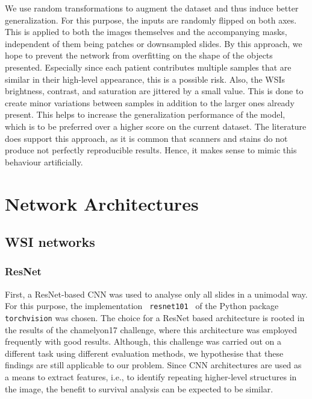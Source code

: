 We use random transformations to augment the dataset and thus induce better generalization. For this purpose, the inputs are randomly flipped on both axes. This is applied to both the images themselves and the accompanying masks, independent of them being patches or downsampled slides. By this approach, we hope to prevent the network from overfitting on the shape of the objects presented. Especially since each patient contributes multiple samples that are similar in their high-level appearance, this is a possible risk.
Also, the WSIs brightness, contrast, and saturation are jittered by a small value. This is done to create minor variations between samples in addition to the larger ones already present. This helps to increase the generalization performance of the model, which is to be preferred over a higher score on the current dataset. The literature does support this approach, as it is common that scanners and stains do not produce not perfectly reproducible results. Hence, it makes sense to mimic this behaviour artificially. \cite{Macenko2009method, Ciompi2017importance}

\section{Network Architectures}
  \label{NetArch}

\subsection{WSI networks}

\subsubsection{ResNet} First, a ResNet-based CNN was used to analyse only all slides in a unimodal way. For this purpose, the implementation \verb | resnet101 | of the Python package \verb|torchvision| was chosen. The choice for a ResNet based architecture is rooted in the results of the chamelyon17 challenge, where this architecture was employed frequently with good results. \cite{Bandi2019Detection} Although, this challenge was carried out on a different task using different evaluation methods, we hypothesise that these findings are still applicable to our problem. Since CNN architectures are used as a means to extract features, i.e., to identify repeating higher-level structures in the image, the benefit to survival analysis can be expected to be similar.

